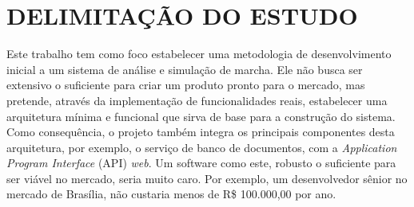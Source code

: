 \section[DELIMITAÇÃO DO ESTUDO]{DELIMITAÇÃO DO ESTUDO}

Este trabalho tem como foco estabelecer uma metodologia de desenvolvimento inicial a um sistema de análise e simulação de marcha. 
Ele não busca ser extensivo o suficiente para criar um produto pronto para o mercado, mas pretende, através da implementação de funcionalidades reais, estabelecer uma arquitetura mínima e funcional que sirva de base para a construção do sistema. 
Como consequência, o projeto também integra os principais componentes desta arquitetura, por exemplo, o serviço de banco de documentos, com a \emph{Application Program Interface} (API) \emph{web}.
Um software como este, robusto o suficiente para ser viável no mercado, seria muito caro. 
Por exemplo, um desenvolvedor sênior no mercado de Brasília, não custaria menos de R\$ 100.000,00 por ano. 

